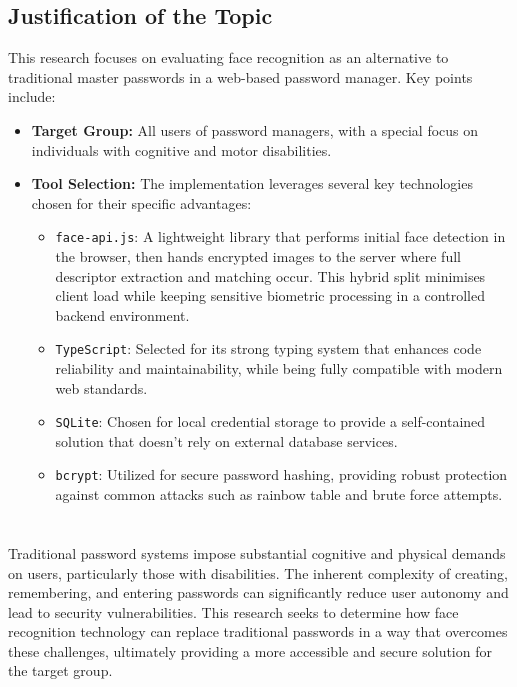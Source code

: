 \subsection{Justification of the Topic}
This research focuses on evaluating face recognition as an alternative to traditional master passwords in a web-based password manager. Key points include:
\begin{itemize}
  \item \textbf{Target Group:} All users of password managers, with a special focus on individuals with cognitive and motor disabilities.
  \item \textbf{Tool Selection:} The implementation leverages several key technologies chosen for their specific advantages:
  \begin{itemize}
    \item \texttt{face-api.js}: A lightweight library that performs initial face detection in the browser, then hands encrypted images to the server where full descriptor extraction and matching occur. This hybrid split minimises client load while keeping sensitive biometric processing in a controlled backend environment.
    \item \texttt{TypeScript}: Selected for its strong typing system that enhances code reliability and maintainability, while being fully compatible with modern web standards.
    \item \texttt{SQLite}: Chosen for local credential storage to provide a self-contained solution that doesn't rely on external database services.
    \item \texttt{bcrypt}: Utilized for secure password hashing, providing robust protection against common attacks such as rainbow table and brute force attempts.
  \end{itemize}
\end{itemize}

\section{}%
\label{sec:probleemstelling}

Traditional password systems impose substantial cognitive and physical demands on users, particularly those with disabilities. The inherent complexity of creating, remembering, and entering passwords can significantly reduce user autonomy and lead to security vulnerabilities. This research seeks to determine how face recognition technology can replace traditional passwords in a way that overcomes these challenges, ultimately providing a more accessible and secure solution for the target group.

